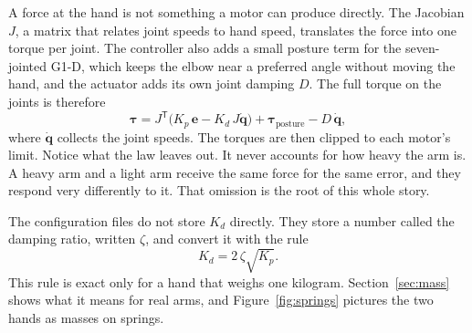 A force at the hand is not something a motor can produce directly. The Jacobian $J$, a matrix that relates joint speeds to hand speed, translates the force into one torque per joint. The controller also adds a small posture term for the seven-jointed G1-D, which keeps the elbow near a preferred angle without moving the hand, and the actuator adds its own joint damping $D$. The full torque on the joints is therefore
\begin{equation}
\bm\tau = J^{\mathsf T}\big(K_p\,\bm e - K_d\,J\dot{\bm q}\big) + \bm\tau_{\text{posture}} - D\,\dot{\bm q},
\end{equation}
where $\dot{\bm q}$ collects the joint speeds. The torques are then clipped to each motor's limit. Notice what the law leaves out. It never accounts for how heavy the arm is. A heavy arm and a light arm receive the same force for the same error, and they respond very differently to it. That omission is the root of this whole story.

The configuration files do not store $K_d$ directly. They store a number called the damping ratio, written $\zeta$, and convert it with the rule
\begin{equation}
K_d = 2\,\zeta\sqrt{K_p}.
\end{equation}
This rule is exact only for a hand that weighs one kilogram. Section~\ref{sec:mass} shows what it means for real arms, and Figure~\ref{fig:springs} pictures the two hands as masses on springs.

